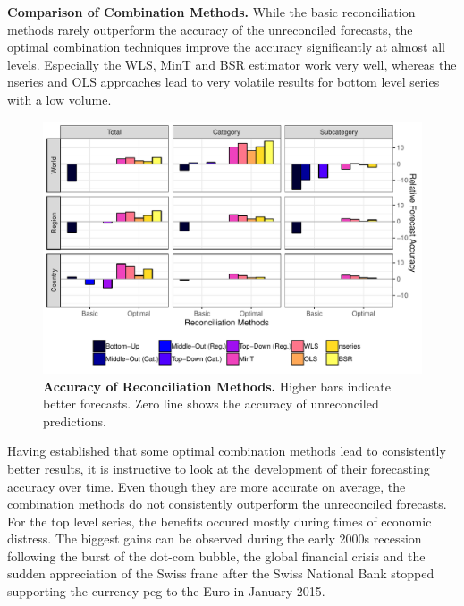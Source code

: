 \documentclass[a4paper,fleqn,11pt]{article}
\begin{document}
\noindent\textbf{Comparison of Combination Methods.} While the basic reconciliation methods rarely outperform the accuracy of the unreconciled forecasts, the optimal combination techniques improve the accuracy significantly at almost all levels. Especially the WLS, MinT and BSR estimator work very well, whereas the nseries and OLS approaches lead to very volatile results for bottom level series with a low volume.
 \begin{figure}[H]
	\includegraphics[width=\textwidth]{fig/fig_eval_rmse_relative}
	\caption[Accuracy of Reconciliation Methods]{\textbf{Accuracy of Reconciliation Methods.} Higher bars indicate better forecasts. Zero line shows the accuracy of unreconciled predictions.} \label{fig:rmse}
\end{figure}
Having established that some optimal combination methods lead to consistently better results, it is instructive to look at the development of their forecasting accuracy over time. Even though they are more accurate on average, the combination methods do not consistently outperform the unreconciled forecasts. For the top level series, the benefits occured mostly during times of economic distress. The biggest gains can be observed during the early 2000s recession following the burst of the dot-com bubble, the global financial crisis and the sudden appreciation of the Swiss franc after the Swiss National Bank stopped supporting the currency peg to the Euro in January 2015.
\end{document}
